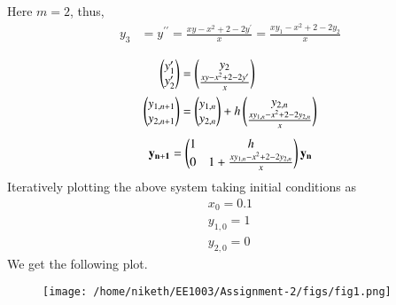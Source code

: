 \documentclass[journal]{IEEEtran}
\begin{document}
Here $m = 2$, thus,
\begin{align}
    y_3 &= y^{\prime\prime} = \frac{xy-x^2+2-2y^{\prime}}{x} = \frac{xy_1-x^2+2-2y_2}{x}\\
\end{align}
\begin{align}
    \begin{pmatrix}y_1^{\prime}\\y_2^{\prime}\end{pmatrix} &= \begin{pmatrix}y_2\\\frac{xy-x^2+2-2y^{\prime}}{x}\end{pmatrix}\\
    \begin{pmatrix}y_{1, n + 1}\\y_{2, n + 1}\end{pmatrix} &= \begin{pmatrix}y_{1, n}\\y_{2, n}\end{pmatrix} + h\begin{pmatrix}y_{2, n}\\\frac{xy_{1,n}-x^2+2-2y_{2,n}}{x}\end{pmatrix}   
\end{align}
\begin{align}
    \mathbf{y_{n + 1}} = \begin{pmatrix}1 & h\\0 & 1 +\frac{xy_{1,n}-x^2+2-2y_{2,n}}{x}\end{pmatrix} \mathbf{y_n}
\end{align}
Iteratively plotting the above system taking initial conditions as 
\begin{align}
    x_0=0.1 \\ y_{1,0}=1 \\ y_{2,0}=0
\end{align}
We get the following plot.
\begin{figure}[!ht]
    \centering
    \texttt{[image: /home/niketh/EE1003/Assignment-2/figs/fig1.png]}
    \caption{}
\end{figure}
\end{document}
